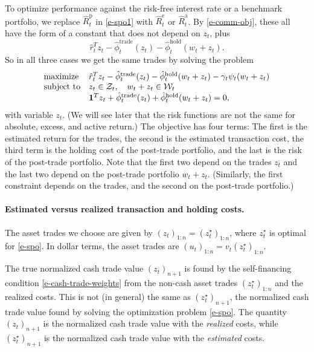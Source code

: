 \documentclass[openany]{article}  %
\newcommand{\trcosthat}{\hat \phi^\mathrm{trade}}
\newcommand{\hldcosthat}{\hat \phi^\mathrm{hold}}
\newcommand{\Rphat}{\hat R^\mathrm{p}}
\newcommand{\Rehat}{\hat R^\mathrm{e}}
\newcommand{\Rahat}{\hat R^\mathrm{a}}
\begin{document}
To optimize performance against the risk-free interest rate
or a benchmark portfolio,
we replace $\Rphat_t$ in \eqref{e-spo1} with $\Rehat_t$ or $\Rahat_t$.
By \eqref{e-comm-obj}, these all have the form of a
constant that does not depend on $z_t$, plus
\[
\hat r_t ^T z_t - \trcosthat_t (z_t) - \hldcosthat_t (w_t + z_t).
\]
So in all three cases we get the same trades by solving the problem
\begin{equation}\label{e-spo}
\begin{array}{ll}
\mbox{maximize} &
\hat r_t^T z_t
- \trcosthat_t (z_t) - \hldcosthat_t (w_t + z_t)
-\gamma_t \psi_t(w_t+z_t)\\
\mbox{subject to} &
z_t \in \mathcal Z_t, \quad
w_t + z_t \in \mathcal W_t \\
& \ones^Tz_t + \trcosthat_t (z_t) + \hldcosthat_t (w_t + z_t) = 0,
\end{array}
\end{equation}
with variable $z_t$.
(We will see later that the risk functions are not the same for absolute, excess, and
active return.)
The objective has four terms: The first is the estimated return
for the trades, the second is the estimated transaction cost,
the third term is the holding cost of the post-trade portfolio,
and the last is the risk of the post-trade portfolio.
Note that the first two depend on the trades $z_t$ and the last two
depend on the post-trade portfolio $w_t+z_t$.
(Similarly, the first constraint depends on the trades, and the second on
the post-trade portfolio.)

\paragraph{Estimated versus realized transaction and holding costs.}
The asset trades we choose are given by $(z_t)_{1:n}=(z_t^\star)_{1:n}$,
where $z_t^\star$ is optimal for \eqref{e-spo}.
In dollar terms, the asset trades are $(u_t)_{1:n}=v_t(z_t^\star)_{1:n}$.

The true normalized cash trade value $(z_t)_{n+1}$ is
found by the self-financing
condition \eqref{e-cash-trade-weights} from the non-cash asset trades
$(z^\star_t)_{1:n}$ and the realized costs.
This is not (in general) the same as $(z_t^\star)_{n+1}$,
the normalized cash trade value found by solving the
optimization problem \eqref{e-spo}.
The quantity $(z_t)_{n+1}$ is the normalized cash trade value with the
\emph{realized} costs, while $(z_t^\star)_{n+1}$ is the normalized cash trade value
with the \emph{estimated} costs.
\end{document}
